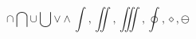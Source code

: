 
\begin{equation}
\cap\bigcap\cup\bigcup\vee\wedge\int, \iint, \iiint, \oint, \diamond, \ominus
\end{equation}
